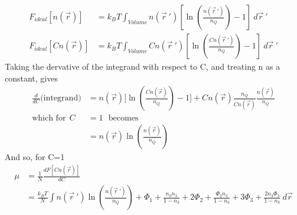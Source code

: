 \documentclass[double,12pt]{revtex4-2}
\begin{document}

\begin{align}
    F_{ideal}[n(\vec{r})] &= k_BT\int_{Volume}n(\vec r~')
      \left[\ln\left(\frac{n(\vec r~')}{n_Q}\right)-1\right] ~d\vec r~' \\
%
    F_{ideal}[Cn(\vec{r})] &= k_BT\int_{Volume}Cn(\vec r~')
      \left[\ln\left(\frac{Cn(\vec r~')}{n_Q}\right)-1\right] ~d\vec r~' 
\end{align} 
Taking the dervative of the integrand with respect to C, and treating n 
as a constant, gives
\begin{align}
  \frac{d}{dC}\Bigg(\text{integrand}\Bigg) &= n(\vec r)\Bigg[\ln\left(
  \frac{Cn(\vec r)}{n_Q}\right)-1\Bigg] + Cn(\vec r)\frac{n_Q}{Cn(\vec r)}\frac{n(\vec r)}{n_Q}\\
  \text{which for} ~~C&=1~~~\text{becomes}~~~ \nonumber\\
  &= n(\vec r)\ln\left(\frac{n(\vec r)}{n_Q}\right)
\end{align} 
And so, for C=1
\begin{align}
   \mu &= \frac{1}{N}\frac{dF[Cn(\vec r)]}{dC} \\
   &= \frac{k_BT}{N}\int n(\vec r~')\ln\left(\frac{n(\vec r~')}{n_Q}\right)
   + \Phi_1 + \frac{n_0n_3}{1-n_3} 
   + 2\Phi_2 + \frac{\Phi_2 n_3}{1-n_3} + 3\Phi_3 + \frac{2n_3\Phi_3}{1-n_3} ~d\vec r    
\end{align} 
\end{document}
